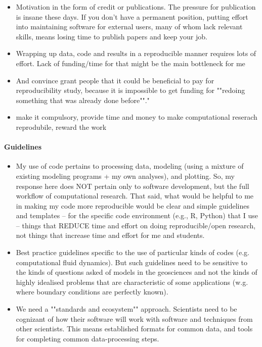 \documentclass{article}
\begin{document}
\begin{itemize}
	\item Motivation in the form of credit or publications.  The pressure for publication is insane these days.  If you don't have a permanent position, putting effort into maintaining software for external users, many of whom lack relevant skills, means losing time to publish papers and keep your job.
	\item Wrapping up data, code and results in a reproducible manner requires lots of effort. Lack of funding/time for that might be the main bottleneck for me
	\item And convince grant people that it could be beneficial to pay for reproducibility study, because it is impossible to get funding for ""redoing something that was already done before""."
	\item make it compulsory, provide time and money to make computational reserach reprodubile, reward the work
\end{itemize}

\paragraph{Guidelines}
\begin{itemize}
	\item My use of code pertains to processing data, modeling (using a mixture of existing modeling programs + my own analyses), and plotting. So, my response here does NOT pertain only to software development, but the full workflow of computational research. That said, what would be helpful to me in making my code more reproducible would be clear and simple guidelines and templates -- for the specific code environment (e.g., R, Python) that I use -- things that REDUCE time and effort on doing reproducible/open research, not things that increase time and effort for me and students.
	\item Best practice guidelines specific to the use of particular kinds of codes (e.g. computational fluid dynamics). But such guidelines need to be sensitive to the kinds of questions asked of models in the geosciences and not the kinds of highly idealised problems that are characteristic of some applications (w.g. where boundary conditions are perfectly known).
	\item We need a ""standards and ecosystem"" approach. Scientists need to be cognizant of how their software will work with software and techniques from other scientists. This means established formats for common data, and tools for completing common data-processing steps.
\end{itemize}
\end{document}
